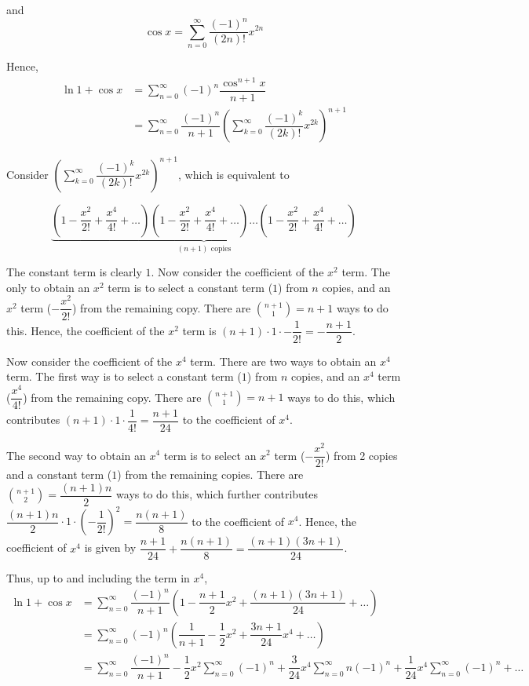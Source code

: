 \documentclass{echw}
\begin{document}
        and 
        \[
            \cos x = \sum_{n=0}^\infty \dfrac{(-1)^n}{(2n)!} x^{2n}
        \]

        Hence,
        \begin{align*}
            \ln{1 + \cos x} &= \sum_{n=0}^\infty (-1)^n \dfrac{\cos^{n+1} x}{n+1}\\
            &= \sum_{n=0}^\infty \dfrac{(-1)^n}{n+1} \left(\sum_{k=0}^\infty \dfrac{(-1)^k}{(2k)!} x^{2k} \right)^{n+1}
        \end{align*}

        Consider $\left(\sum_{k=0}^\infty \dfrac{(-1)^k}{(2k)!} x^{2k} \right)^{n+1}$, which is equivalent to

        \begin{equation*}
            \underbrace{\left(1 - \dfrac{x^2}{2!} + \dfrac{x^4}{4!} + \ldots \right)\left(1 - \dfrac{x^2}{2!} + \dfrac{x^4}{4!} + \ldots \right)\ldots\left(1 - \dfrac{x^2}{2!} + \dfrac{x^4}{4!} + \ldots \right)}_\text{$(n + 1)$ copies}
        \end{equation*}

        The constant term is clearly $1$. Now consider the coefficient of the $x^2$ term. The only to obtain an $x^2$ term is to select a constant term ($1$) from $n$ copies, and an $x^2$ term ($-\dfrac{x^2}{2!}$) from the remaining copy. There are $\displaystyle\binom{n+1}{1} = n+1$ ways to do this. Hence, the coefficient of the $x^2$ term is $(n+1) \cdot 1 \cdot -\dfrac{1}{2!} = -\dfrac{n+1}2$.

        Now consider the coefficient of the $x^4$ term. There are two ways to obtain an $x^4$ term. The first way is to select a constant term ($1$) from $n$ copies, and an $x^4$ term ($\dfrac{x^4}{4!}$) from the remaining copy. There are $\displaystyle\binom{n+1}1 = n+1$ ways to do this, which contributes $(n+1) \cdot 1 \cdot \dfrac{1}{4!} = \dfrac{n+1}{24}$ to the coefficient of $x^4$.

        The second way to obtain an $x^4$ term is to select an $x^2$ term ($-\dfrac{x^2}{2!}$) from 2 copies and a constant term ($1$) from the remaining copies. There are $\displaystyle \binom{n+1}{2} = \dfrac{(n+1)n}2$ ways to do this, which further contributes $\dfrac{(n+1)n}2 \cdot 1 \cdot \left(-\dfrac{1}{2!}\right)^2 = \dfrac{n(n+1)}8$ to the coefficient of $x^4$. Hence, the coefficient of $x^4$ is given by $\dfrac{n+1}{24} + \dfrac{n(n+1)}8 = \dfrac{(n+1)(3n + 1)}{24}$. 

        Thus, up to and including the term in $x^4$,
        \begin{align*}
            \ln{1 + \cos x} &= \sum_{n=0}^\infty \dfrac{(-1)^n}{n+1} \left(1 - \dfrac{n+1}2 x^2 + \dfrac{(n+1)(3n+1)}{24} + \ldots\right)\\
            &= \sum_{n=0}^\infty (-1)^n \left(\dfrac1{n+1} - \dfrac12 x^2 + \dfrac{3n+1}{24}x^4 + \ldots\right)\\
            &= \sum_{n=0}^\infty \dfrac{(-1)^n}{n+1} - \dfrac12 x^2 \sum_{n=0}^\infty (-1)^n + \dfrac{3}{24} x^4 \sum_{n=0}^\infty n(-1)^n + \dfrac1{24} x^4 \sum_{n=0}^\infty (-1)^n + \ldots
        \end{align*}
\end{document}

